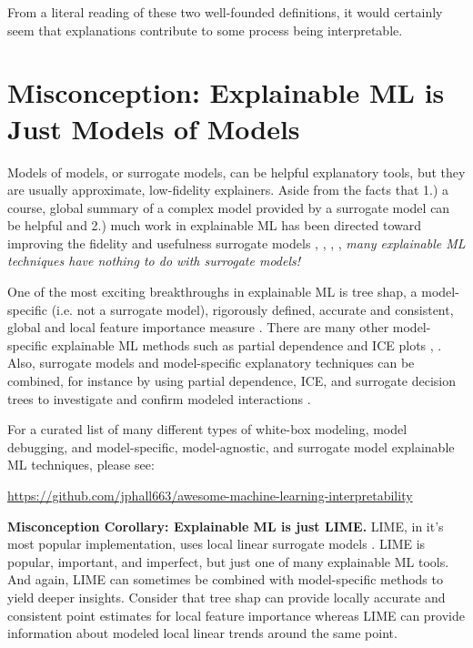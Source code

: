 \documentclass{article}
\begin{document}
From a literal reading of these two well-founded definitions, it would certainly seem that explanations contribute to some process being interpretable.  

\section{Misconception: Explainable ML is Just Models of Models}

Models of models, or surrogate models, can be helpful explanatory tools, but they are usually approximate, low-fidelity explainers. Aside from the facts that 1.) a course, global summary of a complex model provided by a surrogate model can be helpful and 2.) much work in explainable ML has been directed toward improving the fidelity and usefulness surrogate models \citep{dt_surrogate1}, \cite{dt_surrogate2}, \cite{lime-sup}, \cite{wf_xnn}, \textit{many explainable ML techniques have nothing to do with surrogate models!}   

One of the most exciting breakthroughs in explainable ML is tree shap, a model-specific (i.e. not a surrogate model), rigorously defined, accurate and consistent, global and local feature importance measure \cite{tree_shap}. There are many other model-specific explainable ML methods such as partial dependence and ICE plots \cite{esl}, \cite{ice_plots}. Also, surrogate models and model-specific explanatory techniques can be combined, for instance by using partial dependence, ICE, and surrogate decision trees to investigate and confirm modeled interactions \cite{art_and_sci}. 

For a curated list of many different types of white-box modeling, model debugging, and model-specific, model-agnostic, and surrogate model explainable ML techniques, please see:
\begin{center}
\url{https://github.com/jphall663/awesome-machine-learning-interpretability}
\end{center}

\textbf{Misconception Corollary: Explainable ML is just LIME.} LIME, in it's most popular implementation, uses local linear surrogate models \cite{lime}. LIME is popular, important, and imperfect, but just one of many explainable ML tools. And again, LIME can sometimes be combined with model-specific methods to yield deeper insights. Consider that tree shap can provide locally accurate and consistent point estimates for local feature importance whereas LIME can provide information about modeled local linear trends around the same point.   
\end{document}
